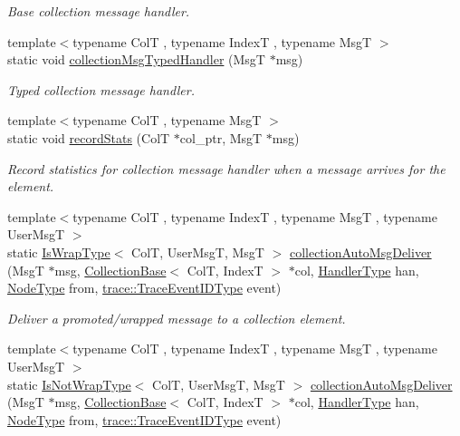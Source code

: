 \begin{DoxyCompactItemize}
\begin{DoxyCompactList}\small\item\em Base collection message handler. \end{DoxyCompactList}\item 
{\footnotesize template$<$typename ColT , typename IndexT , typename MsgT $>$ }\\static void \hyperlink{structvt_1_1vrt_1_1collection_1_1_collection_manager_a7bb443544c8c4b94a7a10a0ec8126018}{collection\+Msg\+Typed\+Handler} (MsgT $\ast$msg)
\begin{DoxyCompactList}\small\item\em Typed collection message handler. \end{DoxyCompactList}\item 
{\footnotesize template$<$typename ColT , typename MsgT $>$ }\\static void \hyperlink{structvt_1_1vrt_1_1collection_1_1_collection_manager_a3d49cc2ae24c50443e890e9447d408a9}{record\+Stats} (ColT $\ast$col\+\_\+ptr, MsgT $\ast$msg)
\begin{DoxyCompactList}\small\item\em Record statistics for collection message handler when a message arrives for the element. \end{DoxyCompactList}\item 
{\footnotesize template$<$typename ColT , typename IndexT , typename MsgT , typename User\+MsgT $>$ }\\static \hyperlink{structvt_1_1vrt_1_1collection_1_1_collection_manager_a1f91c97ed52237c3a3576dfbbe87c8f8}{Is\+Wrap\+Type}$<$ ColT, User\+MsgT, MsgT $>$ \hyperlink{structvt_1_1vrt_1_1collection_1_1_collection_manager_aadfd63d6c0e23384ea1f7ab5f8758d12}{collection\+Auto\+Msg\+Deliver} (MsgT $\ast$msg, \hyperlink{structvt_1_1vrt_1_1collection_1_1_collection_base}{Collection\+Base}$<$ ColT, IndexT $>$ $\ast$col, \hyperlink{namespacevt_af64846b57dfcaf104da3ef6967917573}{Handler\+Type} han, \hyperlink{namespacevt_a866da9d0efc19c0a1ce79e9e492f47e2}{Node\+Type} from, \hyperlink{namespacevt_1_1trace_a64a7185f3e102df8d8258f263ccd1582}{trace\+::\+Trace\+Event\+I\+D\+Type} event)
\begin{DoxyCompactList}\small\item\em Deliver a promoted/wrapped message to a collection element. \end{DoxyCompactList}\item 
{\footnotesize template$<$typename ColT , typename IndexT , typename MsgT , typename User\+MsgT $>$ }\\static \hyperlink{structvt_1_1vrt_1_1collection_1_1_collection_manager_a18e3a17d9eb086c6c2f499242b7faa1e}{Is\+Not\+Wrap\+Type}$<$ ColT, User\+MsgT, MsgT $>$ \hyperlink{structvt_1_1vrt_1_1collection_1_1_collection_manager_a117ccace7fe959fc8db9466239465add}{collection\+Auto\+Msg\+Deliver} (MsgT $\ast$msg, \hyperlink{structvt_1_1vrt_1_1collection_1_1_collection_base}{Collection\+Base}$<$ ColT, IndexT $>$ $\ast$col, \hyperlink{namespacevt_af64846b57dfcaf104da3ef6967917573}{Handler\+Type} han, \hyperlink{namespacevt_a866da9d0efc19c0a1ce79e9e492f47e2}{Node\+Type} from, \hyperlink{namespacevt_1_1trace_a64a7185f3e102df8d8258f263ccd1582}{trace\+::\+Trace\+Event\+I\+D\+Type} event)

\end{DoxyCompactItemize}
